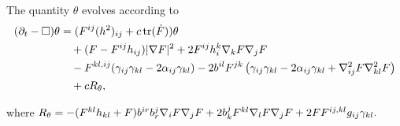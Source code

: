 \documentclass{amsart}
\begin{document}
\begin{lemma}
\label{lem:Evtheta}
The quantity $\theta$ evolves according to
\[
\begin{split}
(\partial_{t} - \Box)\theta &= (F^{ij}(h^2)_{ij} + c\operatorname{tr}(\dot{F}))\theta \\
&\quad + (F - F^{ij}h_{ij})|\nabla F|^{2} + 2F^{ij}h^{k}_{i}\nabla_kF\nabla_jF \\
&\quad - F^{kl,ij} (\gamma_{ij}\gamma_{kl}  - 2\alpha_{ij} \gamma_{kl}) - 2b^{il} F^{jk} \left(\gamma_{ij} \gamma_{kl} - 2\alpha_{ij} \gamma_{kl} + \nabla^2_{ij}F\nabla^2_{kl}F\right) \\
&\quad + cR_{\theta},
\end{split}
\]
\end{lemma}
where
$
R_{\theta} = -(F^{kl}h_{kl} + F)b^{ir}b^{j}_{r}\nabla_i F\nabla_jF + 2 b^{j}_{k}F^{kl}\nabla_lF\nabla_jF + 2 FF^{ij,kl} g_{ij} \gamma_{kl}.
$
\end{document}
